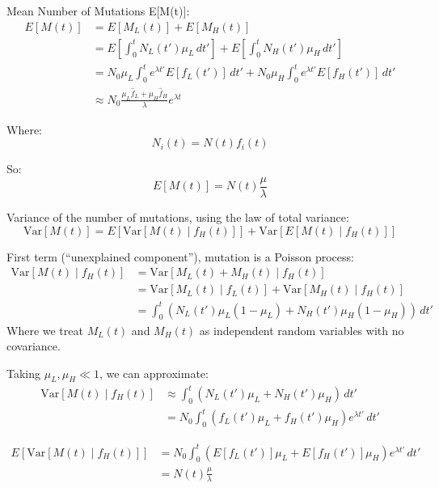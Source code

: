 Mean Number of Mutations E[M(t)]:
\begin{align*}
    E[M(t)] &= E[M_{L}(t)] + E[M_{H}(t)] \\
    &= E\left[\int_{0}^{t} N_{L}(t') \mu_{L} \, dt' \right] + E\left[\int_{0}^{t} N_{H}(t') \mu_{H} \, dt' \right] \\
    &= N_{0} \mu_{L} \int_{0}^{t} e^{\lambda t'} E\left[f_{L}(t')\right] \, dt' + N_{0} \mu_{H} \int_{0}^{t} e^{\lambda t'} E\left[f_{H}(t')\right] \, dt' \\
    &\approx N_{0} \frac{\mu_{L} \hat{f}_{L} + \mu_{H} \hat{f}_{H}}{\lambda} e^{\lambda t}
\end{align*}

Where:
\[
N_{i}(t) = N(t) f_{i}(t)
\]

So:
\begin{equation}
    E[M(t)] = N(t) \frac{\mu}{\lambda}
    \label{eq:mean_mt}
\end{equation}

Variance of the number of mutations, using the law of total variance:
\begin{equation}
    \text{Var}[M(t)] = E\left[\text{Var}[M(t) \mid f_{H}(t)]\right] + \text{Var}\left[E[M(t) \mid f_{H}(t)]\right]
    \label{eq:law_of_total_variance}
\end{equation}

First term (“unexplained component”), mutation is a Poisson process:
\begin{align*}
    \text{Var}[M(t) \mid f_{H}(t)] &= \text{Var}[M_{L}(t) + M_{H}(t) \mid f_{H}(t)] \\
    &= \text{Var}[M_{L}(t) \mid f_{L}(t)] + \text{Var}[M_{H}(t) \mid f_{H}(t)] \\
    &= \int_{0}^{t} \left(N_{L}(t') \mu_{L} (1 - \mu_{L}) + N_{H}(t') \mu_{H} (1 - \mu_{H})\right) \, dt'
\end{align*}
Where we treat $M_{L}(t)$ and $M_{H}(t)$ as independent random variables with no covariance.

Taking $\mu_{L}, \mu_{H} \ll 1$, we can approximate:
\begin{align*}
    \text{Var}[M(t) \mid f_{H}(t)] &\approx \int_{0}^{t} \left(N_{L}(t') \mu_{L} + N_{H}(t') \mu_{H}\right) \, dt' \\
    &= N_{0} \int_{0}^{t} \left(f_{L}(t') \mu_{L} + f_{H}(t') \mu_{H}\right) e^{\lambda t'} \, dt'
\end{align*}

\begin{align*}
E\left[\text{Var}[M(t) \mid f_{H}(t)]\right] &= N_{0} \int_{0}^{t} \left(E\left[f_{L}(t')\right] \mu_{L} + E\left[f_{H}(t')\right] \mu_{H}\right) e^{\lambda t'} \, dt' \\
&= N(t) \frac{\mu}{\lambda}
\end{align*}

